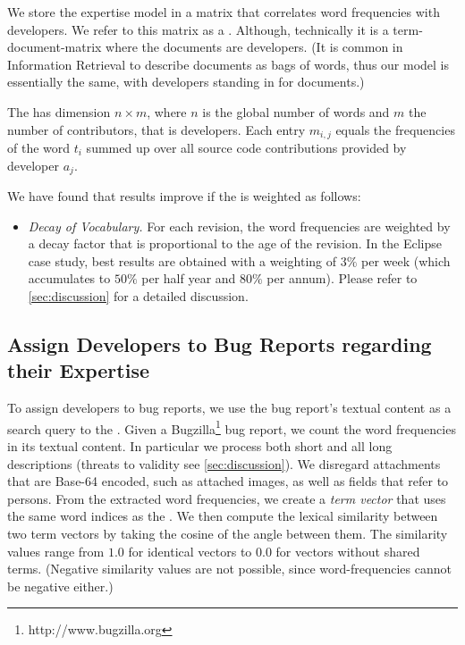 \documentclass[10pt]{book}
\begin{document}
We store the expertise model in a matrix that correlates word frequencies with developers. We refer to this matrix as a \TAM. Although, technically it is a term-document-matrix where the documents are developers. (It is common in Information Retrieval to describe documents as bags of words, thus our model is essentially the same, with developers standing in for documents.)

The \TAM has dimension $n \times m$, where $n$ is the global number of words and $m$ the number of contributors, that is developers. Each entry $m_{i,j}$ equals the frequencies of the word $t_i$ summed up over all source code contributions provided by developer $a_j$.

We have found that results improve if the \TAM is weighted as follows:

\begin{itemize}
\item \emph{Decay of Vocabulary.} For each revision, the word frequencies are weighted by a decay factor that is proportional to the age of the revision. In the Eclipse case study, best results are obtained with a weighting of $3\%$ per week (which accumulates to $50\%$ per half year and $80\%$ per annum). Please refer to \autoref{sec:discussion} for a detailed discussion.
\end{itemize}

\subsection{Assign Developers to Bug Reports regarding their Expertise}

To assign developers to bug reports, we use the bug report's textual content as a search query to the \TAM.
Given a Bugzilla\footnote{http://www.bugzilla.org} bug report, we count the word frequencies in its textual content. In particular we process both short and all long descriptions (threats to validity see \autoref{sec:discussion}).
We disregard attachments that are Base-64 encoded, such as attached images, as well as fields that refer to persons. From the extracted word frequencies, we create a \emph{term vector} that uses the same word indices as the \TAM. %
We then compute the lexical similarity between two term vectors by taking the cosine of the angle between them.
The similarity values range from $1.0$ for identical vectors to $0.0$ for vectors without shared terms. (Negative similarity values are not possible, since word-frequencies cannot be negative either.)
\end{document}
